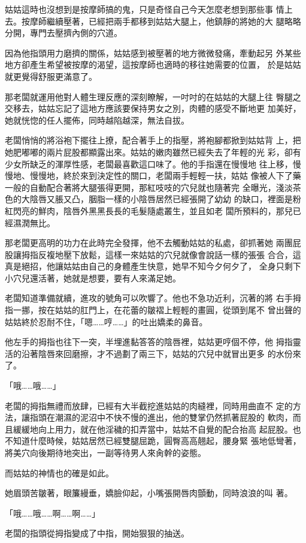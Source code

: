 姑姑這時也沒想到是按摩師搞的鬼，只是奇怪自己今天怎麼老想到那些事
情上去。按摩師繼續壓著，已經把兩手都移到姑姑大腿上，他鎮靜的將她的大
腿略略分開，專門去壓擠內側的穴道。

因為他指頭用力磨擠的關係，姑姑感到被壓著的地方微微發痛，牽動起另
外某些地方卻產生希望被按摩的渴望，這按摩師也適時的移往她需要的位置，
於是姑姑就更覺得舒服更滿意了。

那老闆就運用他對人體生理反應的深刻瞭解，一吋吋的在姑姑的大腿上往
臀腿之交移去，姑姑忘記了這地方應該要保持男女之別，肉體的感受不斷地更
加美好，她就恍惚的任人擺佈，同時越陷越深，無法自拔。

老闆悄悄的將浴袍下擺往上撩，配合著手上的指壓，將袍腳都掀到姑姑背
上，把她肥嘟嘟的兩片屁股都顯露出來。姑姑的嫩肉雖然已經失去了年輕的光
彩，卻有少女所缺乏的渾厚性感，老闆最喜歡這口味了。他的手指還在慢慢地
往上移，慢慢地、慢慢地，終於來到決定性的關口，老闆兩手輕輕一扶，姑姑
像被人下了藥一般的自動配合著將大腿張得更開，那紅吱吱的穴兒就也隨著完
全曝光，淺淡茶色的大陰唇又脹又凸，胭脂一樣的小陰唇居然已經張開了幼幼
的缺口，裡面是粉紅閃亮的鮮肉，陰唇外黑黑長長的毛髮隨處叢生，並且如老
闆所預料的，那兒已經濕潤無比。

那老闆更高明的功力在此時完全發揮，他不去觸動姑姑的私處，卻抓著她
兩團屁股讓拇指反複地壓下放鬆，這樣一來姑姑的穴兒就像會說話一樣的張張
合合，這真是絕招，他讓姑姑由自己的身體產生快意，她早不知今夕何夕了，
全身只剩下小穴兒還活著，她就是想要，要有人來滿足她。

老闆知道準備就續，進攻的號角可以吹響了。他也不急功近利，沉著的將
右手拇指一挪，按在姑姑的肛門上，在花蕾的皺褶上輕輕的畫圓，從頭到尾不
曾出聲的姑姑終於忍耐不住，「嗯……哼……」的吐出嬌柔的鼻音。

他左手的拇指也往下一突，半埋進黏答答的陰唇裡，姑姑更哼個不停，他
拇指靈活的沿著陰唇來回磨擦，才不過劃了兩三下，姑姑的穴兒中就冒出更多
的水份來了。

「哦……哦……」

老闆的拇指無禮而放肆，已經有大半截挖進姑姑的肉縫裡，同時用曲直不
定的方法，讓指頭在潮濕的泥沼中不快不慢的進出，他的雙掌仍然抓著屁股的
軟肉，而且緩緩地向上用力，就在他淫穢的扣弄當中，姑姑不自覺的配合抬高
起屁股。也不知道什麼時候，姑姑居然已經雙腿屈跪，圓臀高高翹起，腰身緊
張地低彎著，將美穴向後期待地突出，一副等待男人來肏幹的姿態。

而姑姑的神情也的確是如此。

她眉頭苦皺著，眼簾縵垂，嬌臉仰起，小嘴張開唇肉顫動，同時浪浪的叫
著。

「哦……哦……啊……啊……」

老闆的指頭從拇指變成了中指，開始狠狠的抽送。

